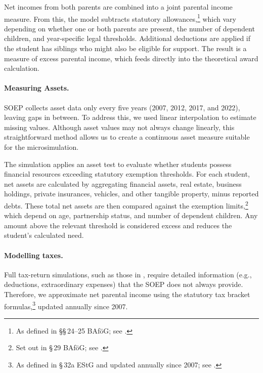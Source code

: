 Net incomes from both parents are combined into a joint parental income measure. 
From this, the model subtracts statutory allowances,\footnote{As defined in §§\,24--25 BAföG; see \citet{bafoeg_law}.} which vary depending on whether one or both parents are present, the number of dependent children, and year-specific legal thresholds.
Additional deductions are applied if the student has siblings who might also be eligible for support. 
The result is a measure of excess parental income, which feeds directly into the theoretical award calculation.


\paragraph{Measuring Assets.}
SOEP collects asset data only every five years (2007, 2012, 2017, and 2022), leaving gaps in between. 
To address this, we used linear interpolation to estimate missing values. 
Although asset values may not always change linearly, this straightforward method allows us to create a continuous asset measure suitable for the microsimulation.

The simulation applies an asset test to evaluate whether students possess financial resources exceeding statutory exemption thresholds. 
For each student, net assets are calculated by aggregating financial assets, real estate, business holdings, private insurances, vehicles, and other tangible property, minus reported debts. 
These total net assets are then compared against the exemption limits,\footnote{Set out in §\,29 BAföG; see \citet{bafoeg_law}.} which depend on age, partnership status, and number of dependent children. 
Any amount above the relevant threshold is considered excess and reduces the student's calculated need.

\paragraph{Modelling taxes.}
Full tax-return simulations, such as those in \cite{herber_non-take-up_2019}, require detailed information (e.g., deductions, extraordinary expenses) that the SOEP does not always provide.  
Therefore, we approximate net parental income using the statutory tax bracket formulas,\footnote{As defined in §\,32a EStG and updated annually since 2007; see \citet{estg_law,estg_2025,estg_2024,estg_2023,estg_2022,estg_2021,estg_2020,estg_2019,estg_2018,estg_2017,estg_2016,estg_2015,estg_2014,estg_2013,estg_2012,estg_2007,estg_2006}.} updated annually since 2007.

